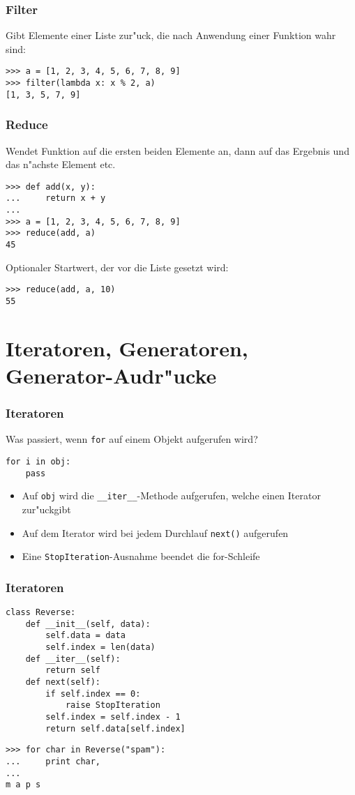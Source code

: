 \begin{frame}[fragile]
\frametitle{Filter}
Gibt Elemente einer Liste zur"uck, die nach Anwendung einer Funktion wahr sind:
\begin{lstlisting}[style=Shell]
>>> a = [1, 2, 3, 4, 5, 6, 7, 8, 9]
>>> filter(lambda x: x % 2, a)
[1, 3, 5, 7, 9]
\end{lstlisting}
\end{frame}

\begin{frame}[fragile]
\frametitle{Reduce}
Wendet Funktion auf die ersten beiden Elemente an, dann auf das Ergebnis und das n"achste Element etc.
\begin{lstlisting}[style=Shell]
>>> def add(x, y):
...     return x + y
...
>>> a = [1, 2, 3, 4, 5, 6, 7, 8, 9]
>>> reduce(add, a)
45
\end{lstlisting}
Optionaler Startwert, der vor die Liste gesetzt wird:
\begin{lstlisting}[style=Shell]
>>> reduce(add, a, 10)
55
\end{lstlisting}
\end{frame}

\section{Iteratoren, Generatoren, Generator-Audr"ucke}

\begin{frame}[fragile]
\frametitle{Iteratoren}
Was passiert, wenn \lstinline{for} auf einem Objekt aufgerufen wird?
\begin{lstlisting}[style=Python]
for i in obj:
    pass
\end{lstlisting}
\begin{itemize}
\item Auf \lstinline{obj} wird die \lstinline{__iter__}-Methode aufgerufen, welche einen Iterator zur"uckgibt
\item Auf dem Iterator wird bei jedem Durchlauf \lstinline{next()} aufgerufen
\item Eine \lstinline{StopIteration}-Ausnahme beendet die for-Schleife
\end{itemize}
\end{frame}

\begin{frame}[fragile]
\frametitle{Iteratoren}
\begin{lstlisting}[style=Python]
class Reverse:
    def __init__(self, data):
        self.data = data
        self.index = len(data)
    def __iter__(self):
        return self
    def next(self):
        if self.index == 0:
            raise StopIteration
        self.index = self.index - 1
        return self.data[self.index]
\end{lstlisting}
\begin{lstlisting}[style=Shell]
>>> for char in Reverse("spam"):
...     print char,
...
m a p s
\end{lstlisting}
\end{frame}

